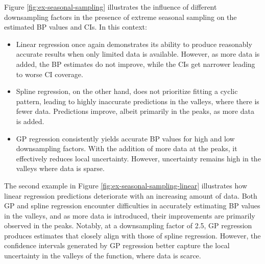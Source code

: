 Figure \ref{fig:ex-seasonal-sampling} illustrates the influence of different
downsampling factors in the presence of extreme seasonal sampling on the estimated
BP values and CIs. In this context:
\begin{itemize}
    \item Linear regression once again demonstrates its ability to produce
    reasonably accurate results when only limited data is available.
    However, as more data is added, the
    BP estimates do not improve, while the CIs get narrower leading to
    worse CI coverage.
    \item Spline regression, on the other hand, does not prioritize fitting
    a cyclic pattern, leading to highly inaccurate predictions in the
    valleys, where there is fewer data.
    Predictions improve, albeit primarily in the peaks, as more data is added.
    \item GP regression consistently yields accurate BP values for high and
    low downsampling factors. With the addition of more data at the peaks,
    it effectively reduces local uncertainty.
    However, uncertainty remains high in the valleys where data is sparse.
\end{itemize}


The second example in Figure \ref{fig:ex-seasonal-sampling-linear} illustrates
how linear regression predictions deteriorate with an increasing amount of data.
Both GP and spline regression encounter difficulties in accurately estimating
BP values in the valleys, and as more data is introduced, their improvements
are primarily observed in the peaks.
Notably, at a downsampling factor of 2.5,
GP regression produces estimates that closely align with those of spline regression.
However, the confidence intervals generated by GP regression better capture the
local uncertainty in the valleys of the function, where data is scarce.


